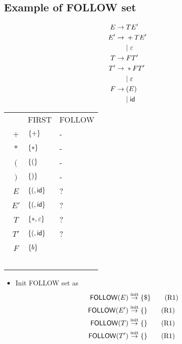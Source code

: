 \documentclass[10pt,a4paper,landscape]{article}
\begin{document}
\begin{multicols*}{3}
\section*{Example of FOLLOW set}
\begin{minipage}{.4\linewidth}
  \begin{align*}
    E \to &\; T E'   \\
    E'\to &\; + T E' \\
          &\;|\; \varepsilon \\
    T \to &\; F T' \\
    T'\to &\; * F T' \\
          &\;|\; \varepsilon \\
    F \to &\; (E) \\
          &\;|\; \mathsf{id}
  \end{align*}
\end{minipage}
\begin{minipage}{.6\linewidth}
  \begin{tabular}{c|l|l}
    & \textsf{FIRST} & \textsf{FOLLOW} \\
    \
    $+$ &  $\{+\}$ & -          \\
    \
    $*$ &  $\{*\}$ & -        \\
    \
    $($ &  $\{(\}$ & -         \\
    \
    $)$ &  $\{)\}$ & -        \\
    \
    $E$ &  $\{(,\mathsf{id}\}$ & ? \\
    \
    $E'$ &  $\{(,\mathsf{id}\}$ & ? \\
    \
    $T$ &  $\{*,\varepsilon\}$ & ? \\
    \
    $T'$ & $\{(, \mathsf{id}\}$ & ? \\
    \
    $F$ & $\{b\}$ & \\
    \
  \end{tabular}
\end{minipage}
\begin{itemize}
\item Init \textsf{FOLLOW} set as \
  \begin{align*}
    \mathsf{FOLLOW}(E) &\overset{\text{init}}{\to} \mset{\$} \tag{R1} \\
    \mathsf{FOLLOW}(E') &\overset{\text{init}}{\to} \mset{} \tag{R1} \\
    \mathsf{FOLLOW}(T) &\overset{\text{init}}{\to} \mset{} \tag{R1} \\
    \mathsf{FOLLOW}(T') &\overset{\text{init}}{\to} \mset{} \tag{R1} \\

\end{align*}
\end{itemize}
\end{multicols*}
\end{document}
